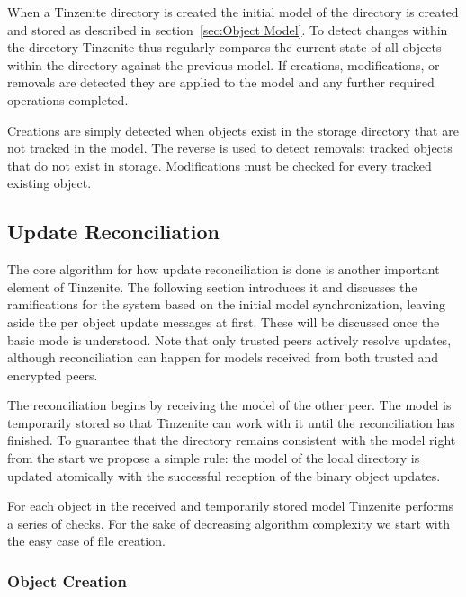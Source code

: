 When a Tinzenite directory is created the initial model of the directory is created and stored as described in section~\ref{sec:Object Model}.
To detect changes within the directory Tinzenite thus regularly compares the current state of all objects within the directory against the previous model.
If creations, modifications, or removals are detected they are applied to the model and any further required operations completed.

Creations are simply detected when objects exist in the storage directory that are not tracked in the model.
The reverse is used to detect removals: tracked objects that do not exist in storage.
Modifications must be checked for every tracked existing object.

\subsection{Update Reconciliation}
\label{sub:Update Reconciliation}

The core algorithm for how update reconciliation is done is another important element of Tinzenite.
The following section introduces it and discusses the ramifications for the system based on the initial model synchronization, leaving aside the per object update messages at first.
These will be discussed once the basic mode is understood.
Note that only trusted peers actively resolve updates, although reconciliation can happen for models received from both trusted and encrypted peers.

The reconciliation begins by receiving the model of the other peer.
The model is temporarily stored so that Tinzenite can work with it until the reconciliation has finished.
To guarantee that the directory remains consistent with the model right from the start we propose a simple rule: the model of the local directory is updated atomically with the successful reception of the binary object updates.

For each object in the received and temporarily stored model Tinzenite performs a series of checks.
For the sake of decreasing algorithm complexity we start with the easy case of file creation.

\subsubsection{Object Creation}
\label{subs:Object Creation}

